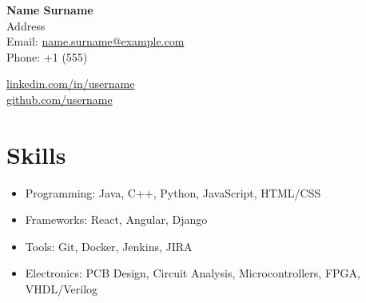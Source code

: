 \documentclass[a4paper,12pt]{article} %
\begin{document}
\vspace{1\baselineskip}

\noindent
\begin{minipage}[t]{0.6\textwidth}
    \raggedright
    {\LARGE \textbf{Name Surname}}\\
    \vspace{1\baselineskip}
    Address\\
    Email: \href{mailto:name.surname@example.com}{name.surname@example.com}\\
    Phone: +1 (555)\\
\end{minipage}
\hfill
\begin{minipage}[t]{0.3\textwidth}
    \begin{flushright}
        \vspace{2\baselineskip}
        \href{https://linkedin.com/in/name-surname}{linkedin.com/in/username}\\
        \href{https://github.com/namesurname}{github.com/username}
    \end{flushright}
\end{minipage}
\bigskip

\section*{Skills}
\begin{itemize}[leftmargin=*]
    \item Programming: Java, C++, Python, JavaScript, HTML/CSS
    \item Frameworks: React, Angular, Django
    \item Tools: Git, Docker, Jenkins, JIRA
    \item Electronics: PCB Design, Circuit Analysis, Microcontrollers, FPGA, VHDL/Verilog
\end{itemize}
\end{document}
